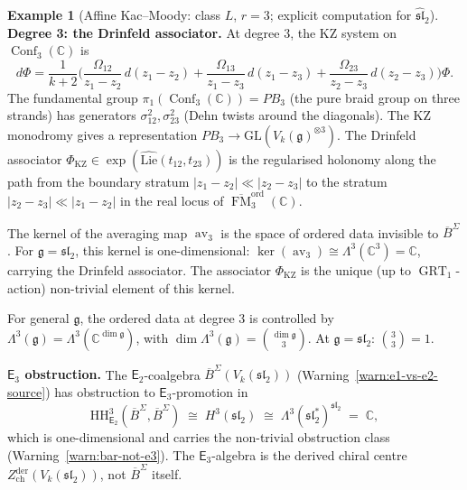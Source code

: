 \documentclass[11pt,reqno]{amsart}
\theoremstyle{definition}
\newtheorem{example}[theorem]{Example}
\theoremstyle{remark}
\newcommand{\HH}{\mathrm{HH}}
\newcommand{\Etwo}{\mathsf{E}_{2}}
\newcommand{\Ethree}{\mathsf{E}_{3}}
\newcommand{\Lie}{\mathrm{Lie}}
\DeclareMathOperator{\Conf}{Conf}
\DeclareMathOperator{\FM}{FM}
\DeclareMathOperator{\av}{av}
\DeclareMathOperator{\GRT}{GRT}
\newcommand{\fg}{\mathfrak{g}}
\newcommand{\BarSig}{\overline{B}^{\Sigma}}
\newcommand{\CC}{\mathbb{C}}
\numberwithin{equation}{section}
\begin{document}
\begin{example}[Affine Kac--Moody: class $L$, $r = 3$;
explicit computation for $\widehat{\mathfrak{sl}}_2$]
\smallskip
\noindent\textbf{Degree 3: the Drinfeld associator.}
At degree $3$, the KZ system on $\Conf_3(\CC)$ is
\begin{equation}\label{eq:kz-3pt}
  d\Phi = \frac{1}{k + 2}
  \biggl(\frac{\Omega_{12}}{z_1 - z_2}\,d(z_1 - z_2)
  + \frac{\Omega_{13}}{z_1 - z_3}\,d(z_1 - z_3)
  + \frac{\Omega_{23}}{z_2 - z_3}\,d(z_2 - z_3)
  \biggr)\Phi.
\end{equation}
The fundamental group $\pi_1(\Conf_3(\CC)) = PB_3$
(the pure braid group on three strands) has generators
$\sigma_{12}^2, \sigma_{23}^2$ (Dehn twists around the
diagonals). The KZ monodromy gives a representation
$PB_3 \to \mathrm{GL}(V_k(\fg)^{\otimes 3})$.
The Drinfeld associator
$\Phi_{\mathrm{KZ}} \in
\exp(\widehat{\Lie}(t_{12}, t_{23}))$ is the regularised
holonomy along the path from the boundary stratum
$|z_1 - z_2| \ll |z_2 - z_3|$ to the stratum
$|z_2 - z_3| \ll |z_1 - z_2|$ in the real locus of
$\overline{\FM}_3^{\mathrm{ord}}(\CC)$.

The kernel of the averaging map $\av_3$ is the space of
ordered data invisible to $\BarSig$. For
$\fg = \mathfrak{sl}_2$, this kernel is one-dimensional:
$\ker(\av_3) \cong \Lambda^3(\CC^3) = \CC$, carrying the
Drinfeld associator. The associator $\Phi_{\mathrm{KZ}}$
is the unique (up to $\GRT_1$-action) non-trivial element
of this kernel.

For general $\fg$, the ordered data at degree $3$ is
controlled by
$\Lambda^3(\fg) = \Lambda^3(\CC^{\dim\fg})$, with
$\dim \Lambda^3(\fg) = \binom{\dim\fg}{3}$.
At $\fg = \mathfrak{sl}_2$: $\binom{3}{3} = 1$.

\smallskip
\noindent\textbf{$\Ethree$ obstruction.}
The $\Etwo$-coalgebra $\BarSig(V_k(\mathfrak{sl}_2))$
(Warning~\ref{warn:e1-vs-e2-source}) has obstruction to
$\Ethree$-promotion in
\begin{equation}\label{eq:e3-obstruction-km}
  \HH^3_{\Etwo}(\BarSig, \BarSig)
  \;\cong\; H^3(\mathfrak{sl}_2)
  \;\cong\; \Lambda^3(\mathfrak{sl}_2^*)^{\mathfrak{sl}_2}
  \;=\; \CC,
\end{equation}
which is one-dimensional and carries the non-trivial
obstruction class (Warning~\ref{warn:bar-not-e3}).
The $\Ethree$-algebra is the derived chiral centre
$Z^{\mathrm{der}}_{\mathrm{ch}}(V_k(\mathfrak{sl}_2))$,
not $\BarSig$ itself.


\end{example}
\end{document}
